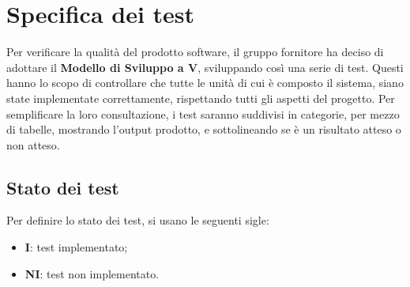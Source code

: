 \section{Specifica dei test}
Per verificare la qualità del prodotto software, il gruppo fornitore ha deciso di adottare il \textbf{Modello di Sviluppo a V}\glo, sviluppando così una serie di test. Questi hanno lo scopo di controllare che tutte le unità di cui è composto il sistema, siano state implementate correttamente, rispettando tutti gli aspetti del progetto.
Per semplificare la loro consultazione, i test saranno suddivisi in categorie, per mezzo di tabelle, mostrando l'output prodotto, e sottolineando se è un risultato atteso o non atteso.
\subsection{Stato dei test}
Per definire lo stato dei test, si usano le seguenti sigle:
\begin{itemize}
\item \textbf{I}: test implementato;
\item \textbf{NI}: test non implementato.
\end{itemize}


